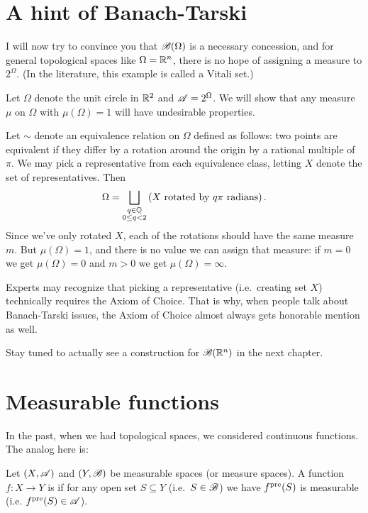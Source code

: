 \section{A hint of Banach-Tarski}
I will now try to convince you that $\mathscr B(\Omega)$
is a necessary concession,
and for general topological spaces like $\Omega = \mathbb R^n$,
there is no hope of assigning a measure to $2^{\Omega}$.
(In the literature, this example is called a Vitali set.)
\begin{example}
	[A geometric example why $\SA = 2^\Omega$ is unsuitable]
	Let $\Omega$ denote the unit circle in $\mathbb R^2$
	and $\SA = 2^\Omega$.
	We will show that any measure $\mu$ on $\Omega$
	with $\mu(\Omega) = 1$ will have undesirable properties.

	Let $\sim$ denote an equivalence relation on $\Omega$
	defined as follows: two points are equivalent
	if they differ by a rotation around the origin by a rational multiple of $\pi$.
	We may pick a representative from each equivalence class,
	letting $X$ denote the set of representatives.
	Then
	\[ \Omega = \bigsqcup_{\substack{q \in \mathbb Q \\ 0 \le q < 2}}
		\left( X \text{ rotated by $q\pi$ radians} \right).  \]
	Since we've only rotated $X$,
	each of the rotations should have the same measure $m$.
	But $\mu(\Omega) = 1$,
	and there is no value we can assign that measure:
	if $m = 0$ we get $\mu(\Omega) = 0$
	and $m > 0$ we get $\mu(\Omega) = \infty$.
\end{example}
\begin{remark}
	[Choice]
	Experts may recognize that picking a representative
	(i.e.\ creating set $X$)
	technically requires the Axiom of Choice.
	That is why, when people talk about Banach-Tarski issues,
	the Axiom of Choice almost always gets honorable mention as well.
\end{remark}

Stay tuned to actually see a construction for $\mathscr B(\mathbb R^n)$
in the next chapter.

\section{Measurable functions}
\label{sec:measurable_functions}
In the past, when we had topological spaces,
we considered continuous functions.
The analog here is:
\begin{definition}
	Let $(X, \mathscr A)$ and $(Y, \mathscr B)$ be measurable spaces
	(or measure spaces).
	A function $f \colon X \to Y$ is 
	if for any open set $S \subseteq Y$ (i.e.\ $S \in \mathscr B$)
	we have $f^{\text{pre}}(S)$ is measurable (i.e. $f^{\text{pre}}(S) \in \mathscr A$).
\end{definition}

